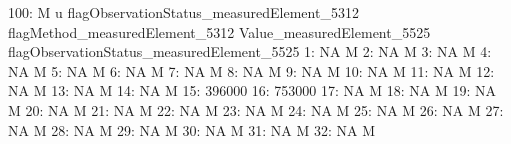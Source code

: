 \documentclass[nojss]{jss}
\begin{document}
\begin{Schunk}
\begin{Soutput}
100:                                          M                               u
     flagObservationStatus_measuredElement_5312 flagMethod_measuredElement_5312
     Value_measuredElement_5525 flagObservationStatus_measuredElement_5525
  1:                         NA                                          M
  2:                         NA                                          M
  3:                         NA                                          M
  4:                         NA                                          M
  5:                         NA                                          M
  6:                         NA                                          M
  7:                         NA                                          M
  8:                         NA                                          M
  9:                         NA                                          M
 10:                         NA                                          M
 11:                         NA                                          M
 12:                         NA                                          M
 13:                         NA                                          M
 14:                         NA                                          M
 15:                     396000                                           
 16:                     753000                                           
 17:                         NA                                          M
 18:                         NA                                          M
 19:                         NA                                          M
 20:                         NA                                          M
 21:                         NA                                          M
 22:                         NA                                          M
 23:                         NA                                          M
 24:                         NA                                          M
 25:                         NA                                          M
 26:                         NA                                          M
 27:                         NA                                          M
 28:                         NA                                          M
 29:                         NA                                          M
 30:                         NA                                          M
 31:                         NA                                          M
 32:                         NA                                          M

\end{Soutput}
\end{Schunk}
\end{document}
